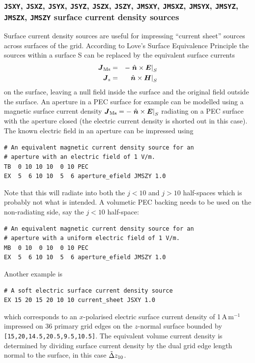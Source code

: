 \documentclass[onecolumn,a4paper]{article}
\numberwithin{equation}{section}
\begin{document}
\subsubsection{\texttt{JSXY}, \texttt{JSXZ}, \texttt{JSYX}, \texttt{JSYZ}, \texttt{JSZX}, \texttt{JSZY},
\texttt{JMSXY}, \texttt{JMSXZ}, \texttt{JMSYX}, \texttt{JMSYZ}, \texttt{JMSZX}, \texttt{JMSZY} surface current density sources}
\label{sc:softsurfcur}

Surface current density sources are useful for impressing ``current sheet'' sources across surfaces of the grid. 
According to Love's Surface Equivalence Principle the sources within a surface
S can be replaced by the equivalent surface currents 
\begin{eqnarray}
\boldsymbol{J}_\mathrm{Ms} &=& -\left. \hat{\boldsymbol{n}} \times \boldsymbol{E} \right|_S \\
\boldsymbol{J}_\mathrm{s}  &=&  \left. \hat{\boldsymbol{n}} \times \boldsymbol{H} \right|_S
\end{eqnarray}
on the surface, leaving a null field inside the surface and the original
field outside the surface. An aperture in a PEC surface for 
example can be modelled using a magnetic surface current density 
$\boldsymbol{J}_\mathrm{Ms} = -\left. \hat{\boldsymbol{n}} \times \boldsymbol{E} \right|_S$
radiating on a PEC surface with the aperture closed (the electric current
density is shorted out in this case). The known electric
field in an aperture can be impressed using
\begin{verbatim}
# An equivalent magnetic current density source for an
# aperture with an electric field of 1 V/m.
TB  0 10 10 10  0 10 PEC
EX  5  6 10 10  5  6 aperture_efield JMSZY 1.0
\end{verbatim}
Note that this will radiate into both the $j<10$ and $j>10$ half-spaces which is 
probably not what is intended. A volumetic PEC backing needs to be used on the 
non-radiating side, say the $j<10$ half-space:
\begin{verbatim}
# An equivalent magnetic current density source for an
# aperture with a uniform electric field of 1 V/m.
MB  0 10  0 10  0 10 PEC
EX  5  6 10 10  5  6 aperture_efield JMSZY 1.0
\end{verbatim}

Another example is
\begin{verbatim}
# A soft electric surface current density source
EX 15 20 15 20 10 10 current_sheet JSXY 1.0
\end{verbatim}
which corresponds to an $x$-polarised electric surface current density of 1\,A\,m$^{-1}$ impressed on 36 primary
grid edges on the $z$-normal surface bounded by \texttt{[15,20,14.5,20.5,9.5,10.5]}. The equivalent volume current density
is determined by dividing surface current density by the dual grid edge length normal to the surface, 
in this case $\tilde{\Delta} z_{10}$.
\end{document}
